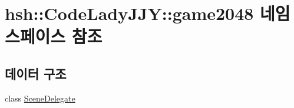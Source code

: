 \hypertarget{namespacehsh_1_1_code_lady_j_j_y_1_1game2048}{}\section{hsh\+:\+:Code\+Lady\+J\+JY\+:\+:game2048 네임스페이스 참조}
\label{namespacehsh_1_1_code_lady_j_j_y_1_1game2048}
\subsection*{데이터 구조}
\begin{DoxyCompactItemize}
\item 
class \hyperlink{classhsh_1_1_code_lady_j_j_y_1_1game2048_1_1_scene_delegate}{Scene\+Delegate}
\end{DoxyCompactItemize}
